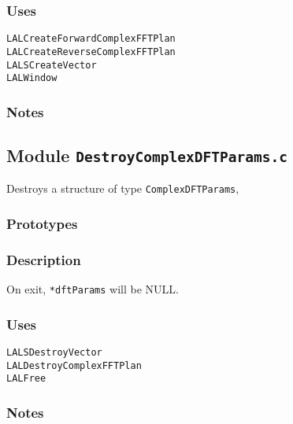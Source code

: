 \subsubsection*{Uses}
\begin{verbatim}
LALCreateForwardComplexFFTPlan
LALCreateReverseComplexFFTPlan
LALSCreateVector
LALWindow 
\end{verbatim}

\subsubsection*{Notes}

\vfill{\footnotesize}

\newpage
\subsection{Module \texttt{DestroyComplexDFTParams.c}}
\label{ss:DestroyComplexDFTParams.c}

Destroys a structure of type \verb+ComplexDFTParams+,

\subsubsection*{Prototypes}
\vspace{0.1in}


\subsubsection*{Description}

On exit, \verb+*dftParams+ will be NULL.

\subsubsection*{Uses}
\begin{verbatim}
LALSDestroyVector
LALDestroyComplexFFTPlan
LALFree
\end{verbatim}

\subsubsection*{Notes}

\vfill{\footnotesize}

